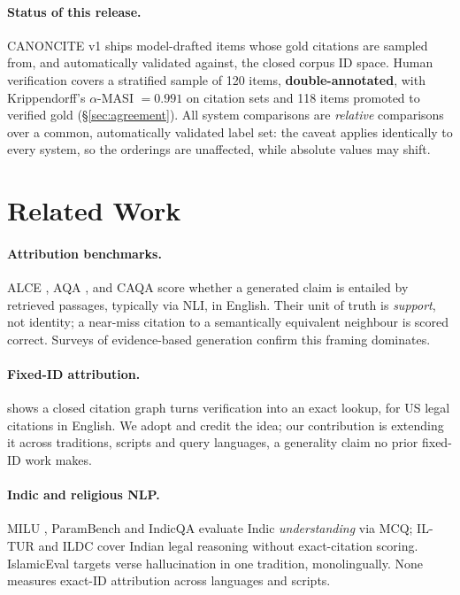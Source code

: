 \documentclass[11pt]{article}
\begin{document}
\paragraph{Status of this release.} CANONCITE v1 ships model-drafted items whose
gold citations are sampled from, and automatically validated against, the closed
corpus ID space. Human verification covers a stratified sample of 120 items,
\textbf{double-annotated}, with Krippendorff's $\alpha$-MASI $=0.991$ on
citation sets and 118 items promoted to verified gold (\S\ref{sec:agreement}). All system
comparisons are \emph{relative} comparisons over a common, automatically
validated label set: the caveat applies identically to every system, so the
orderings are unaffected, while absolute values may shift.

\section{Related Work}

\paragraph{Attribution benchmarks.} ALCE \cite{gao2023alce}, AQA
\cite{bohnet2022aqa}, and CAQA \cite{hu2025caqa} score whether a generated claim
is entailed by retrieved passages, typically via NLI, in English. Their unit of
truth is \emph{support}, not identity; a near-miss citation to a semantically
equivalent neighbour is scored correct. Surveys of evidence-based generation
\cite{evidencesurvey2025} confirm this framing dominates.

\paragraph{Fixed-ID attribution.} \citet{ovcharov2026citation} shows a closed
citation graph turns verification into an exact lookup, for US legal citations
in English. We adopt and credit the idea; our contribution is extending it
across traditions, scripts and query languages, a generality claim no prior
fixed-ID work makes.

\paragraph{Indic and religious NLP.} MILU \cite{verma2024milu}, ParamBench
\cite{parambench2025} and IndicQA \cite{indicqa2024} evaluate Indic
\emph{understanding} via MCQ; IL-TUR \cite{iltur2024} and ILDC
\cite{malik2021ildc} cover Indian legal reasoning without exact-citation
scoring. IslamicEval \cite{islamiceval2025} targets verse hallucination in one
tradition, monolingually. None measures exact-ID attribution across languages
and scripts.
\end{document}
